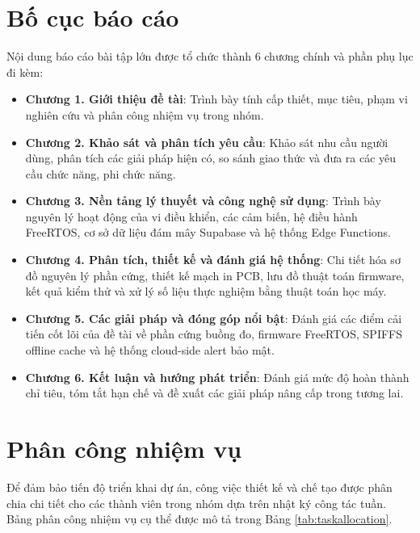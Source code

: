 \section{Bố cục báo cáo}
Nội dung báo cáo bài tập lớn được tổ chức thành 6 chương chính và phần phụ lục đi kèm:
\begin{itemize}
    \item \textbf{Chương 1. Giới thiệu đề tài}: Trình bày tính cấp thiết, mục tiêu, phạm vi nghiên cứu và phân công nhiệm vụ trong nhóm.
    \item \textbf{Chương 2. Khảo sát và phân tích yêu cầu}: Khảo sát nhu cầu người dùng, phân tích các giải pháp hiện có, so sánh giao thức và đưa ra các yêu cầu chức năng, phi chức năng.
    \item \textbf{Chương 3. Nền tảng lý thuyết và công nghệ sử dụng}: Trình bày nguyên lý hoạt động của vi điều khiển, các cảm biến, hệ điều hành FreeRTOS, cơ sở dữ liệu đám mây Supabase và hệ thống Edge Functions.
    \item \textbf{Chương 4. Phân tích, thiết kế và đánh giá hệ thống}: Chi tiết hóa sơ đồ nguyên lý phần cứng, thiết kế mạch in PCB, lưu đồ thuật toán firmware, kết quả kiểm thử và xử lý số liệu thực nghiệm bằng thuật toán học máy.
    \item \textbf{Chương 5. Các giải pháp và đóng góp nổi bật}: Đánh giá các điểm cải tiến cốt lõi của đề tài về phần cứng buồng đo, firmware FreeRTOS, SPIFFS offline cache và hệ thống cloud-side alert bảo mật.
    \item \textbf{Chương 6. Kết luận và hướng phát triển}: Đánh giá mức độ hoàn thành chỉ tiêu, tóm tắt hạn chế và đề xuất các giải pháp nâng cấp trong tương lai.
\end{itemize}

\section{Phân công nhiệm vụ}
Để đảm bảo tiến độ triển khai dự án, công việc thiết kế và chế tạo được phân chia chi tiết cho các thành viên trong nhóm dựa trên nhật ký công tác tuần. Bảng phân công nhiệm vụ cụ thể được mô tả trong Bảng \ref{tab:taskallocation}.

